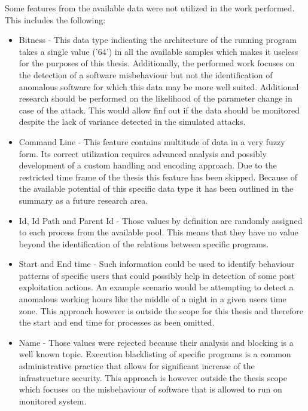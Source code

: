 \documentclass[a4paper,twoside,12pt]{book}
\begin{document}
Some features from the available data were not utilized in the work performed. This includes
the following:
\begin{itemize}
	\item Bitness - This data type indicating the architecture of the running program takes a single value ('64')
	in all the available samples which makes it useless for the purposes of this thesis. Additionally, the performed
	work focuses on the detection of a software misbehaviour but not the identification of anomalous software 
	for which this data may be more well suited. Additional research should be performed on the likelihood of the
	parameter change in case of the attack. This would allow finf out if the data should be monitored despite
	the lack of variance detected in the simulated attacks.
	\item Command Line -  This feature contains multitude of data in a very fuzzy form. Its correct utilization
	requires advanced analysis and possibly development of a custom handling and encoding approach. Due 
	to the restricted time frame of the thesis this feature has been skipped. Because of the available potential
	of this specific data type it has been outlined in the summary as a future research area.
	\item Id, Id Path and Parent Id - Those values by definition are randomly assigned to each process from the available
	pool. This means that they have no value beyond the identification of the relations between specific programs. 
	\item Start and End time - Such information could be used to identify behaviour patterns of specific users that could possibly help
	in detection of some post exploitation actions. An example scenario would be attempting to detect a anomalous
	working hours like the middle of a night in a given users time zone. This approach however is outside the 
	scope for this thesis and therefore the start and end time for processes as been omitted.
	\item Name - Those values were rejected because their analysis and blocking is a well known topic. Execution 
	blacklisting of specific programs is a common administrative practice that allows for significant increase
	of the infrastructure security. This approach is however outside the thesis scope which focuses on the 
	misbehaviour of software that is allowed to run on monitored system.
\end{itemize}
\end{document}
